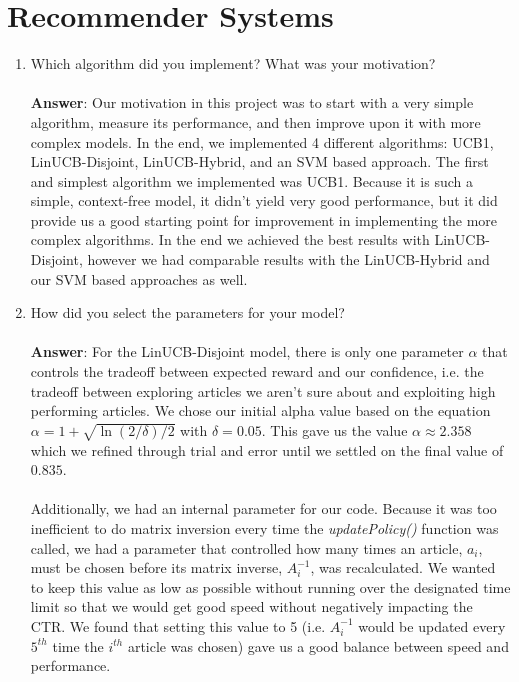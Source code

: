 \documentclass[11pt]{article}
\begin{document}
\section{Recommender Systems}

\begin{enumerate}
\item Which algorithm did you implement? What was your motivation? \\ \\
\textbf{Answer}: Our motivation in this project was to start with a very simple algorithm,
measure its performance, and then improve upon it with more complex models.  In
the end, we implemented 4 different algorithms: UCB1, LinUCB-Disjoint,
LinUCB-Hybrid, and an SVM based approach.  The first and simplest algorithm we
implemented was UCB1.  Because it is such a simple, context-free model, it
didn't yield very good performance, but it did provide us a good starting point
for improvement in implementing the more complex algorithms. In the end we
achieved the best results with LinUCB-Disjoint, however we had comparable
results with the LinUCB-Hybrid and our SVM based approaches as well.

\item How did you select the parameters for your model? \\ \\
\textbf{Answer}: For the LinUCB-Disjoint model, there is only one parameter
$\alpha$ that controls the tradeoff between expected reward and our confidence,
i.e. the tradeoff between exploring articles we aren't sure about and exploiting
high performing articles. We chose our initial alpha value based on the equation
$\alpha=1+\sqrt{\ln(2/\delta)/2}$ with $\delta=0.05$.  This gave us the value
$\alpha\approx2.358$ which we refined through trial and error until we settled
on the final value of $0.835$. \\ \\
Additionally, we had an internal parameter for our code.  Because it was too
inefficient to do matrix inversion every time the \textit{updatePolicy()}
function was called, we had a parameter that controlled how many times an
article, $a_i$, must be chosen before its matrix inverse, $A_{i}^{-1}$, was
recalculated. We wanted to keep this value as low as possible without running
over the designated time limit so that we would get good speed without
negatively impacting the CTR. We found that setting this value to 5 (i.e.
$A_{i}^{-1}$ would be updated every $5^{th}$ time the $i^{th}$ article was
chosen) gave us a good balance between speed and performance.


\end{enumerate}
\end{document}
